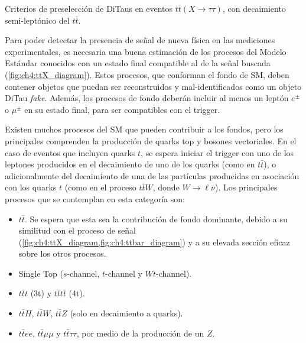 \begin{table}[t]
    \small\centering
    \setlength{\tabcolsep}{1mm}
    
    \caption{Criterios de preselección de DiTaus en eventos $t\bar{t}(X\to\tau\tau)$, con decaimiento semi-leptónico del $t\bar{t}$.}
    \label{tbl:ch4:presel:ditaus}
\end{table}





 \label{sec:ch4:bkg_processes}

Para poder detectar la presencia de señal de nueva física en las mediciones experimentales, es necesaria una buena estimación de los procesos del Modelo Estándar conocidos con un estado final compatible al de la señal buscada (\cref{fig:ch4:ttX_diagram}). Estos procesos, que conforman el fondo de SM, deben contener objetos que puedan ser reconstruidos y mal-identificados como un objeto DiTau \textit{fake}. Además, los procesos de fondo deberán incluir al menos un leptón $e^\pm$ o $\mu^\pm$ en su estado final, para ser compatibles con el trigger.

Existen muchos procesos del SM que pueden contribuir a los fondos, pero los principales comprenden la producción de quarks top y bosones vectoriales. En el caso de eventos que incluyen quarks $t$, se espera iniciar el trigger con uno de los leptones producidos en el decaimiento de uno de los quarks (como en $t\bar{t}$), o adicionalmente del decaimiento de una de las partículas producidas en asociación con los quarks $t$ (como en el proceso $t\bar{t}W$, donde $W\to\ell\nu$). Los principales procesos que se contemplan en esta categoría son:
\begin{itemize}
    \item $t\bar{t}$. Se espera que esta sea la contribución de fondo dominante, debido a su similitud con el proceso de señal (\cref{fig:ch4:ttX_diagram,fig:ch4:ttbar_diagram}) y a su elevada sección eficaz sobre los otros procesos.
    \item Single Top ($s$-channel, $t$-channel y $Wt$-channel).
    \item $t\bar{t}t$ (3t) y $t\bar{t}t\bar{t}$ (4t).
    \item $t\bar{t}H$, $t\bar{t}W$, $t\bar{t}Z$ (solo en decaimiento a quarks).
    \item $t\bar{t}ee$, $t\bar{t}\mu\mu$ y $t\bar{t}\tau\tau$, por medio de la producción de un $Z$.
\end{itemize}

